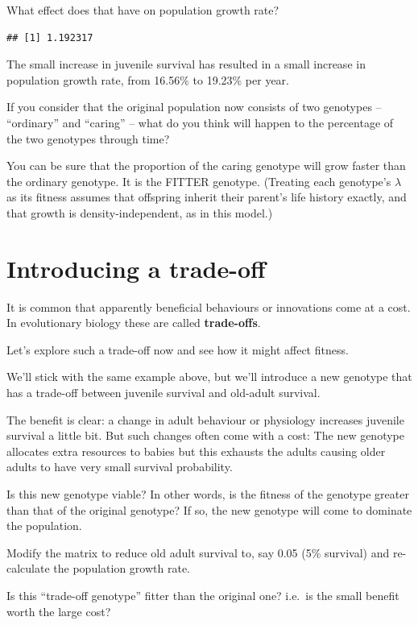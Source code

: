 \documentclass[
  a4paper]{book}
\begin{document}
What effect does that have on population growth rate?

\begin{verbatim}
## [1] 1.192317
\end{verbatim}

The small increase in juvenile survival has resulted in a small increase in population growth rate, from 16.56\% to 19.23\% per year.

If you consider that the original population now consists of two genotypes -- ``ordinary'' and ``caring'' -- what do you think will happen to the percentage of the two genotypes through time?

You can be sure that the proportion of the caring genotype will grow faster than the ordinary genotype. It is the FITTER genotype. (Treating each genotype's \(\lambda\) as its fitness assumes that offspring inherit their parent's life history exactly, and that growth is density-independent, as in this model.)

\section{Introducing a trade-off}\label{introducing-a-trade-off}

It is common that apparently beneficial behaviours or innovations come at a cost. In evolutionary biology these are called \textbf{trade-offs}.

Let's explore such a trade-off now and see how it might affect fitness.

We'll stick with the same example above, but we'll introduce a new genotype that has a trade-off between juvenile survival and old-adult survival.

The benefit is clear: a change in adult behaviour or physiology increases juvenile survival a little bit.
But such changes often come with a cost: The new genotype allocates extra resources to babies but this exhausts the adults causing older adults to have very small survival probability.

Is this new genotype viable? In other words, is the fitness of the genotype greater than that of the original genotype? If so, the new genotype will come to dominate the population.

Modify the matrix to reduce old adult survival to, say 0.05 (5\% survival) and re-calculate the population growth rate.

Is this ``trade-off genotype'' fitter than the original one? i.e.~is the small benefit worth the large cost?
\end{document}
